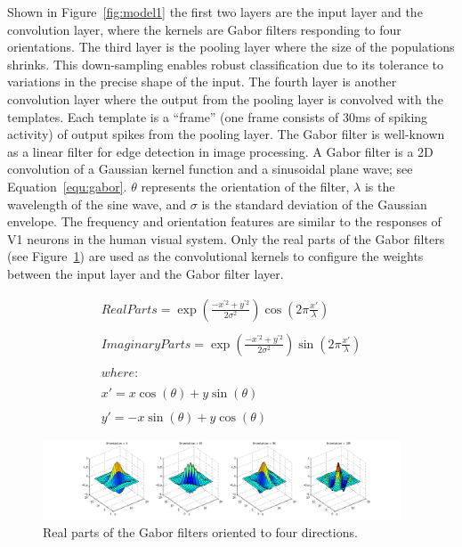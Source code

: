 Shown in Figure~\ref{fig:model1} the first two layers are the input layer and the convolution layer, where the kernels are Gabor filters responding to four orientations. 
The third layer is the pooling layer where the size of the populations shrinks. 
This down-sampling enables robust classification due to its tolerance to variations in the precise shape of the input. 
The fourth layer is another convolution layer where the output from the pooling layer is convolved with the templates. 
Each template is a “frame” (one frame consists of 30ms of spiking activity) of output spikes from the pooling layer.
The Gabor filter is well-known as a linear filter for edge detection in image processing. 
A Gabor filter is a 2D convolution of a Gaussian kernel function and a sinusoidal plane wave; see Equation~\ref{equ:gabor}. 
$\theta$ represents the orientation of the filter, $\lambda$ is the wavelength of the sine wave, and $\sigma$ is the standard deviation of the Gaussian envelope. 
The frequency and orientation features are similar to the responses of V1 neurons in the human visual system. 
Only the real parts of the Gabor filters (see Figure~\ref{fig:gabor}) are used as the convolutional kernels to configure the weights between the input layer and the Gabor filter layer.

\begin{equation}
\begin{array}{l}
Real Parts = \exp (\frac{-x^{'2}+y^{'2}}{2\sigma ^{2}})\cos (2\pi\frac{{x}'}{\lambda })
\\
\\
Imaginary Parts = \exp (\frac{-x^{'2}+y^{'2}}{2\sigma ^{2}})\sin (2\pi\frac{{x}'}{\lambda })
\\
\\
where:
\\
\\
{x}'=x\cos (\theta ) + y\sin (\theta)
\\
\\
{y}'=-x\sin (\theta ) + y\cos (\theta)
\end{array}
\label{equ:gabor}
\end{equation}


\begin{figure}
\centering
	\includegraphics[width=0.95\textwidth]{pics/gabor.png}
	\caption{Real parts of the Gabor filters oriented to four directions.}
	\label{fig:gabor}
\end{figure}

